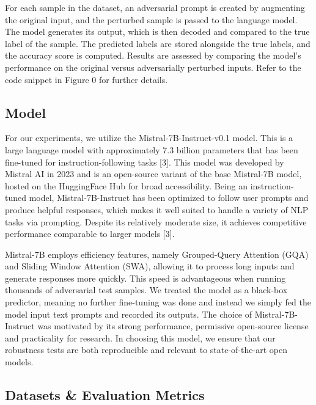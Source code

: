 \documentclass[conference]{IEEEtran}
\begin{document}
For each sample in the dataset, an adversarial prompt is created by augmenting the original input, and the perturbed sample is passed to the language model. The model generates its output, which is then decoded and compared to the true label of the sample. The predicted labels are stored alongside the true labels, and the accuracy score is computed. Results are assessed by comparing the model's performance on the original versus adversarially perturbed inputs. Refer to the code snippet in Figure 0 for further details.

\subsection{Model}

For our experiments, we utilize the Mistral-7B-Instruct-v0.1 model. This is a large language model with approximately 7.3 billion parameters that has been fine-tuned for instruction-following tasks [3]. This model was developed by Mistral AI in 2023 and is an open-source variant of the base Mistral-7B model, hosted on the HuggingFace Hub for broad accessibility. Being an instruction-tuned model, Mistral-7B-Instruct has been optimized to follow user prompts and produce helpful responses, which makes it well suited to handle a variety of NLP tasks via prompting. Despite its relatively moderate size, it achieves competitive performance comparable to larger models [3].

Mistral-7B employs efficiency features, namely Grouped-Query Attention (GQA) and Sliding Window Attention (SWA), allowing it to process long inputs and generate responses more quickly. This speed is advantageous when running thousands of adversarial test samples. We treated the model as a black-box predictor, meaning no further fine-tuning was done and instead we simply fed the model input text prompts and recorded its outputs. The choice of Mistral-7B-Instruct was motivated by its strong performance, permissive open-source license and practicality for research. In choosing this model, we ensure that our robustness tests are both reproducible and relevant to state-of-the-art open models.

\subsection{Datasets \& Evaluation Metrics}
\end{document}
